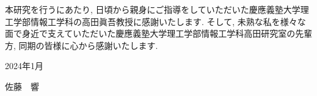 \acknowledge


本研究を行うにあたり, 日頃から親身にご指導をしていただいた慶應義塾大学理工学部情報工学科の高田眞吾教授に感謝いたします.
そして, 未熟な私を様々な面で身近で支えていただいた慶應義塾大学理工学部情報工学科高田研究室の先輩方, 同期の皆様に心から感謝いたします. 


2024年1月 
\begin{flushright}
  {\Large 佐藤　響}
\end{flushright}